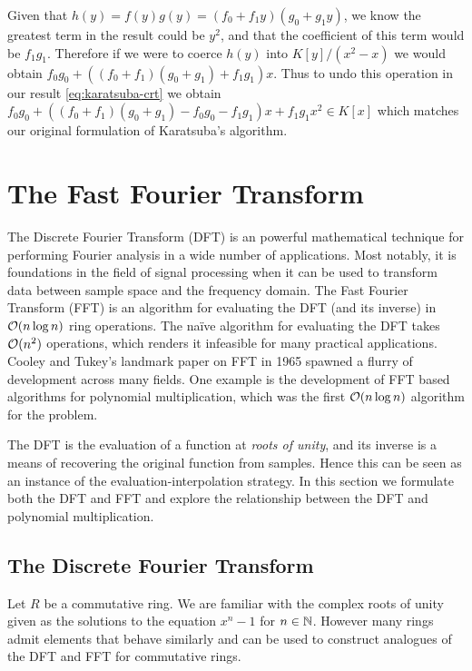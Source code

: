 Given that $h(y) = f(y)g(y) = (f_0 + f_1y)(g_0 + g_1 y)$, we know the greatest term in the result could be $y^2$, and that the coefficient of this term would be $f_1g_1$. Therefore if we were to coerce $h(y)$ into $K[y]/(x^2 - x)$ we would obtain $f_0g_0 + ((f_0 + f_1)(g_0 + g_1) + f_1g_1)x$. Thus to undo this operation in our result \eqref{eq:karatsuba-crt} we obtain $f_0g_0 + ((f_0 + f_1)(g_0 + g_1) - f_0g_0 - f_1g_1)x + f_1g_1x^2 \in K[x]$ which matches our original formulation of Karatsuba's algorithm.

\section{The Fast Fourier Transform}


The Discrete Fourier Transform (DFT) is an powerful mathematical technique for performing Fourier analysis in a wide number of applications. Most notably, it is foundations in the field of signal processing when it can be used to transform data between sample space and the frequency domain. The Fast Fourier Transform (FFT) is an algorithm for evaluating the DFT (and its inverse) in $\mathcal O(n \log n)$ ring operations. The na\"{i}ve algorithm for evaluating the DFT takes $\mathcal O(n^2)$ operations, which renders it infeasible for many practical applications. Cooley and Tukey's landmark paper on FFT in 1965\cite{fft} spawned a flurry of development across many fields. One example is the development of FFT based algorithms for polynomial multiplication, which was the first $\mathcal O(n \log n)$ algorithm for the problem.


The DFT is the evaluation of a function at \textit{roots of unity}, and its inverse is a means of recovering the original function from samples. Hence this can be seen as an instance of the evaluation-interpolation strategy. 
In this section we formulate both the DFT and FFT and explore the relationship between the DFT and polynomial multiplication.

\subsection{The Discrete Fourier Transform}

Let $R$ be a commutative ring. We are familiar with the complex roots of unity given as the solutions to the equation $x^n - 1$ for $n \in {\mathbb N}$. However many rings admit elements that behave similarly and can be used to construct analogues of the DFT and FFT for commutative rings.

